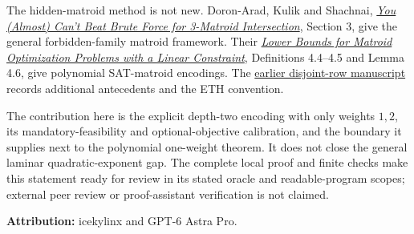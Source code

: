 The hidden-matroid method is not new. Doron-Arad, Kulik and Shachnai, \href{https://arxiv.org/html/2412.02217v2}{\emph{You (Almost) Can't Beat Brute Force for 3-Matroid Intersection}}, Section 3, give the general forbidden-family matroid framework. Their \href{https://arxiv.org/html/2307.07773v2}{\emph{Lower Bounds for Matroid Optimization Problems with a Linear Constraint}}, Definitions 4.4--4.5 and Lemma 4.6, give polynomial SAT-matroid encodings. The \href{https://github.com/icekylinx/algorithm-frontier/blob/main/problems/weighted-prefix-quota-frontier/manuscripts/disjoint-row-root-target-sharp-lower.md}{earlier disjoint-row manuscript} records additional antecedents and the ETH convention.

The contribution here is the explicit depth-two encoding with only weights \(1,2\), its mandatory-feasibility and optional-objective calibration, and the boundary it supplies next to the polynomial one-weight theorem. It does not close the general laminar quadratic-exponent gap. The complete local proof and finite checks make this statement ready for review in its stated oracle and readable-program scopes; external peer review or proof-assistant verification is not claimed.

\textbf{Attribution:} icekylinx and GPT-6 Astra Pro.
